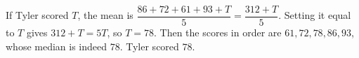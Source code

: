 If Tyler scored $T$, the mean is $\dfrac{86+72+61+93+T}{5}=\dfrac{312+T}{5}$. Setting it equal to $T$ gives $312+T=5T$, so $T=78$. Then the scores in order are $61,72,78,86,93$, whose median is indeed $78$. Tyler scored $\boxed{78}$.
